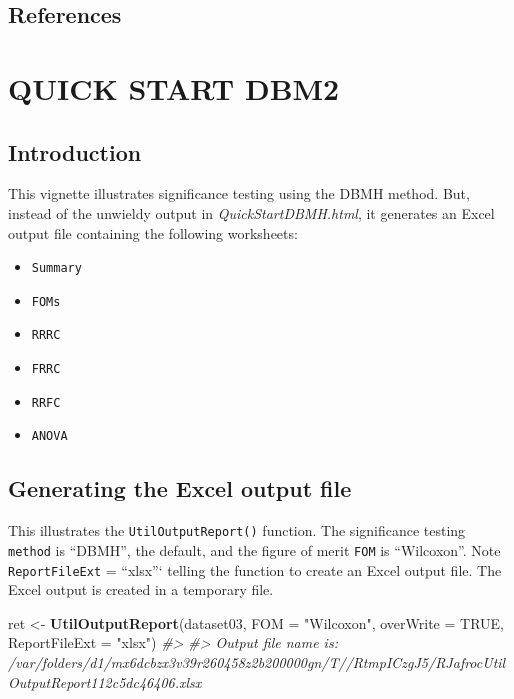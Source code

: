 \documentclass[]{book}
\newenvironment{Shaded}{\begin{snugshade}}{\end{snugshade}}
\newcommand{\CommentTok}[1]{\textcolor[rgb]{0.56,0.35,0.01}{\textit{#1}}}
\newcommand{\DataTypeTok}[1]{\textcolor[rgb]{0.13,0.29,0.53}{#1}}
\newcommand{\KeywordTok}[1]{\textcolor[rgb]{0.13,0.29,0.53}{\textbf{#1}}}
\newcommand{\NormalTok}[1]{#1}
\newcommand{\OtherTok}[1]{\textcolor[rgb]{0.56,0.35,0.01}{#1}}
\newcommand{\StringTok}[1]{\textcolor[rgb]{0.31,0.60,0.02}{#1}}
\providecommand{\tightlist}{%
  \setlength{\itemsep}{0pt}\setlength{\parskip}{0pt}}
\begin{document}
\hypertarget{references-5}{%
\section{References}\label{references-5}}

\hypertarget{QuickStartDBM2}{%
\chapter{QUICK START DBM2}\label{QuickStartDBM2}}

\hypertarget{introduction-5}{%
\section{Introduction}\label{introduction-5}}

This vignette illustrates significance testing using the DBMH method. But, instead of the unwieldy output in \emph{QuickStartDBMH.html}, it generates an Excel output file containing the following worksheets:

\begin{itemize}
\tightlist
\item
  \texttt{Summary}
\item
  \texttt{FOMs}
\item
  \texttt{RRRC}
\item
  \texttt{FRRC}
\item
  \texttt{RRFC}
\item
  \texttt{ANOVA}
\end{itemize}

\hypertarget{generating-the-excel-output-file}{%
\section{Generating the Excel output file}\label{generating-the-excel-output-file}}

This illustrates the \texttt{UtilOutputReport()} function. The significance testing \texttt{method} is ``DBMH'', the default, and the figure of merit \texttt{FOM} is ``Wilcoxon''. Note \texttt{ReportFileExt} = ``xlsx''` telling
the function to create an Excel output file. The Excel output is created in a temporary file.

\begin{Shaded}
\begin{Highlighting}[]
\NormalTok{ret <-}\StringTok{ }\KeywordTok{UtilOutputReport}\NormalTok{(dataset03, }\DataTypeTok{FOM =} \StringTok{"Wilcoxon"}\NormalTok{, }\DataTypeTok{overWrite =} \OtherTok{TRUE}\NormalTok{, }\DataTypeTok{ReportFileExt =} \StringTok{"xlsx"}\NormalTok{)}
\CommentTok{#> }
\CommentTok{#> Output file name is:      /var/folders/d1/mx6dcbzx3v39r260458z2b200000gn/T//RtmpICzgJ5/RJafrocUtilOutputReport112c5dc46406.xlsx}
\end{Highlighting}
\end{Shaded}
\end{document}
